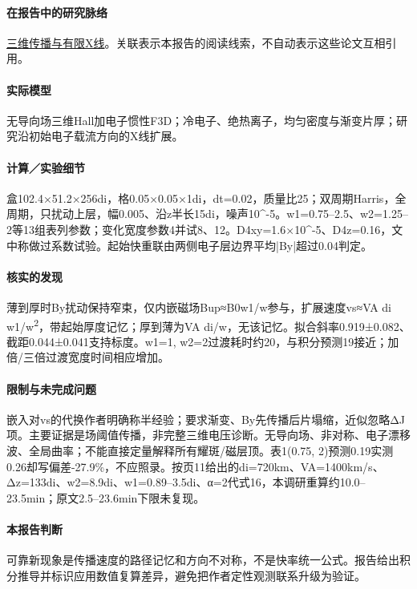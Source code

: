 \paragraph{在报告中的研究脉络}\hyperref[story:three]{三维传播与有限X线}。关联表示本报告的阅读线索，不自动表示这些论文互相引用。

\paragraph{实际模型}无导向场三维Hall加电子惯性F3D；冷电子、绝热离子，均匀密度与渐变片厚；研究沿初始电子载流方向的X线扩展。

\paragraph{计算／实验细节}盒102.4×51.2×256di，格0.05×0.05×1di，dt=0.02，质量比25；双周期Harris，全周期，只扰动上层，幅0.005、沿z半长15di，噪声10\textasciicircum{}-5。w1=0.75–2.5、w2=1.25–2等13组表列参数；变化宽度参数4并试8、12。D4xy=1.6×10\textasciicircum{}-5、D4z=0.16，文中称做过系数试验。起始快重联由两侧电子层边界平均|By|超过0.04判定。

\paragraph{核实的发现}薄到厚时By扰动保持窄束，仅内嵌磁场Bup≈B0w1/w参与，扩展速度vs≈VA di w1/w\textsuperscript{2}，带起始厚度记忆；厚到薄为VA di/w，无该记忆。拟合斜率0.919±0.082、截距0.044±0.041支持标度。w1=1, w2=2过渡耗时约20，与积分预测19接近；加倍/三倍过渡宽度时间相应增加。

\paragraph{限制与未完成问题}嵌入对vs的代换作者明确称半经验；要求渐变、By先传播后片塌缩，近似忽略ΔJ项。主要证据是场阈值传播，非完整三维电压诊断。无导向场、非对称、电子漂移波、全局曲率；不能直接定量解释所有耀斑/磁层顶。表1(0.75, 2)预测0.19实测0.26却写偏差-27.9\%，不应照录。按页11给出的di=720km、VA=1400km/s、Δz=133di、w2=8.9di、w1=0.89–3.5di、α=2代式16，本调研重算约10.0–23.5min；原文2.5–23.6min下限未复现。

\paragraph{本报告判断}可靠新现象是传播速度的路径记忆和方向不对称，不是快率统一公式。报告给出积分推导并标识应用数值复算差异，避免把作者定性观测联系升级为验证。

